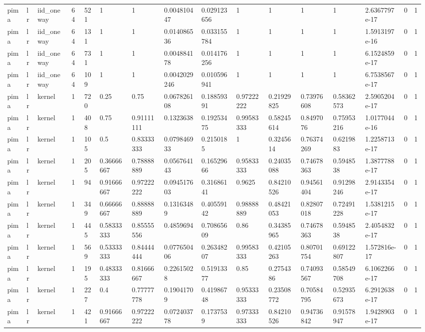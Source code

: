 \begin{tabular}{llllllllllllllll}
pima & lr & iid\_oneway & 64 & 521 & 1 & 1 & 0.004810447 & 0.029123656 & 1 & 1 & 1 & 1 & 2.6367797e-17 & 0 & 1 \\
pima & lr & iid\_oneway & 64 & 131 & 1 & 1 & 0.014086536 & 0.033155784 & 1 & 1 & 1 & 1 & 1.5913197e-16 & 0 & 1 \\
pima & lr & iid\_oneway & 64 & 731 & 1 & 1 & 0.004884178 & 0.014176256 & 1 & 1 & 1 & 1 & 6.1524859e-17 & 0 & 1 \\
pima & lr & iid\_oneway & 64 & 109 & 1 & 1 & 0.0042029246 & 0.010596941 & 1 & 1 & 1 & 1 & 6.7538567e-17 & 0 & 1 \\
pima & lr & kernel & 1 & 720 & 0.25 & 0.75 & 0.067826108 & 0.18859391 & 0.97222222 & 0.21929825 & 0.73976608 & 0.58362573 & 2.5905204e-17 & 0 & 1 \\
pima & lr & kernel & 1 & 408 & 0.75 & 0.91111111 & 0.1323638 & 0.19253475 & 0.99583333 & 0.58245614 & 0.8497076 & 0.75953216 & 1.0177044e-16 & 0 & 1 \\
pima & lr & kernel & 1 & 105 & 0.5 & 0.83333333 & 0.079846933 & 0.2150185 & 1 & 0.3245614 & 0.76374269 & 0.6219883 & 1.2258713e-17 & 0 & 1 \\
pima & lr & kernel & 1 & 205 & 0.36666667 & 0.78888889 & 0.056764143 & 0.16529666 & 0.95833333 & 0.24035088 & 0.74678363 & 0.5948538 & 1.3877788e-17 & 0 & 1 \\
pima & lr & kernel & 1 & 94 & 0.91666667 & 0.97222222 & 0.094517603 & 0.31686141 & 0.9625 & 0.84210526 & 0.94561404 & 0.91298246 & 2.9143354e-17 & 0 & 1 \\
pima & lr & kernel & 1 & 349 & 0.66666667 & 0.88888889 & 0.13163489 & 0.40559142 & 0.98888889 & 0.48421053 & 0.82807018 & 0.72491228 & 1.5381215e-17 & 0 & 1 \\
pima & lr & kernel & 1 & 445 & 0.58333333 & 0.85555556 & 0.4859694 & 0.70865609 & 0.86 & 0.34385965 & 0.74678363 & 0.5948538 & 2.4054832e-17 & 0 & 1 \\
pima & lr & kernel & 1 & 569 & 0.53333333 & 0.84444444 & 0.077650406 & 0.26348207 & 0.99583333 & 0.42105263 & 0.80701754 & 0.69122807 & 1.572816e-17 & 0 & 1 \\
pima & lr & kernel & 1 & 195 & 0.48333333 & 0.81666667 & 0.22615028 & 0.51913377 & 0.85 & 0.2754386 & 0.74093567 & 0.58549708 & 6.1062266e-17 & 0 & 1 \\
pima & lr & kernel & 1 & 227 & 0.4 & 0.77777778 & 0.19041709 & 0.41986748 & 0.95333333 & 0.23508772 & 0.70584795 & 0.52935673 & 6.2912638e-17 & 0 & 1 \\
pima & lr & kernel & 1 & 421 & 0.91666667 & 0.97222222 & 0.072403778 & 0.1737539 & 0.97333333 & 0.84210526 & 0.94736842 & 0.91578947 & 1.9428903e-17 & 0 & 1 \\

\end{tabular}
